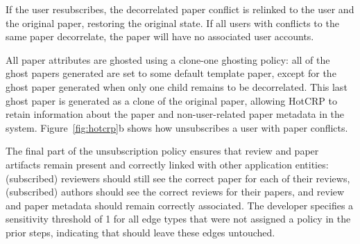 If the user resubscribes, the decorrelated paper conflict is relinked to the user and the original
paper, restoring the original state.  If all users with conflicts to the same paper decorrelate, the
paper will have no associated user accounts.

All paper attributes are ghosted using a clone-one ghosting policy: all of the ghost papers
generated are set to some default template paper, except for the ghost paper generated when only one
child remains to be decorrelated.  This last ghost paper is generated as a clone of the original
paper, allowing HotCRP to retain information about the paper and non-user-related paper metadata in
the system.  
Figure~\ref{fig:hotcrp}b shows how \sys unsubscribes a user with paper conflicts. 


The final part of the unsubscription policy ensures that review and paper artifacts remain present
and correctly linked with other application entities: (subscribed) reviewers should still see the
correct paper for each of their reviews, (subscribed) authors should see the correct reviews for
their papers, and review and paper metadata should remain correctly associated. The developer
specifies a sensitivity threshold of 1 for all edge types that were not assigned a policy in the
prior steps, indicating that \sys should leave these edges untouched.


